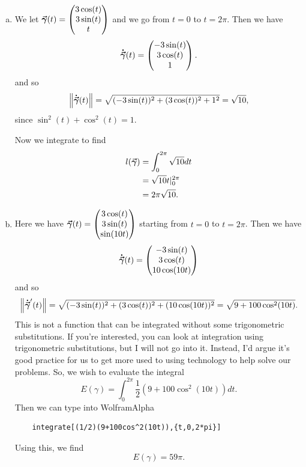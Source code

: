 \documentclass[12pt]{article} %
\begin{document}
\begin{solution}~
\begin{enumerate}[(a)]
    \item We let $\boldsymbol{\vec{\gamma}}(t) = \begin{pmatrix} 3\cos (t) \\ 3\sin(t) \\ t\end{pmatrix}$ and we go from $t=0$ to $t=2\pi$. Then we have
\[
\boldsymbol{\dot{\vec{\gamma}}}(t) =\begin{pmatrix} -3\sin(t) \\ 3\cos(t) \\ 1\end{pmatrix}.
\]
and so
\[
\left\|\boldsymbol{\dot{\vec{\gamma}}}(t)\right\| = \sqrt{(-3\sin (t))^2+(3\cos (t))^2+1^2} = \sqrt{10},
\]
since $\sin^2(t)+\cos^2(t)=1$.

Now we integrate to find
\begin{align*}
    l(\boldsymbol{\vec{\gamma}}) &= \int_0^{2\pi} \sqrt{10}dt\\
    &= \sqrt{10} t|_0^{2\pi}\\
    &= 2\pi \sqrt{10}.
\end{align*}
    \item Here we have $\boldsymbol{\vec{\gamma}}(t)=\begin{pmatrix} 3\cos(t) \\ 3\sin(t) \\ \sin(10t)\end{pmatrix}$ starting from $t=0$ to $t=2\pi$. Then we have
    \[
    \boldsymbol{\dot{\vec{\gamma}}}(t)=\begin{pmatrix} -3\sin(t) \\ 3\cos(t) \\ 10\cos(10t)\end{pmatrix}
    \]
    and so
    \[
    \left\|\boldsymbol{\dot{\vec{\gamma}}}'(t)\right\| = \sqrt{(-3\sin(t))^2+(3\cos(t))^2+(10\cos(10t))^2} = \sqrt{9+100\cos^2(10t)}.
    \]
    This is not a function that can be integrated without some trigonometric substitutions.  If you're interested, you can look at integration using trigonometric substitutions, but I will not go into it. Instead, I'd argue it's good practice for us to get more used to using technology to help solve our problems.  So, we wish to evaluate the integral
    \[
    E(\gamma) = \int_0^{2\pi} \frac{1}{2}(9+100\cos^2(10t))dt.
    \]
	Then we can type into WolframAlpha
	\begin{verbatim}
	integrate[(1/2)(9+100cos^2(10t)),{t,0,2*pi}]
	\end{verbatim}
    
    Using this, we find
    \[
    E(\gamma)=59\pi.
    \]

\end{enumerate}
\end{solution}
\end{document}
